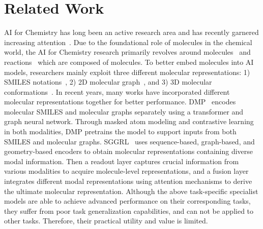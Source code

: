 \section{Related Work}

AI for Chemistry has long been an active research area and has recently garnered increasing attention~\cite{molformer, chemberta, honda2019smiles,graphcl, xia2023molebert, MGSSL, ying2021transformers,Denoising, 3dEMGP, zhou2023unimol, chen2023towards,shi2023relm,sagawa2023reactiont5, fang2023mol}. Due to the foundational role of molecules in the chemical world, the AI for Chemistry research primarily revolves around molecules~\cite{molformer, chemberta, honda2019smiles,graphcl, xia2023molebert, MGSSL, ying2021transformers,Denoising, 3dEMGP, zhou2023unimol} and reactions~\cite{chen2023towards,shi2023relm,sagawa2023reactiont5} which are composed of molecules. To better embed molecules into AI models, researchers mainly exploit three different molecular representations: 1) SMILES notations~\cite{molformer,chemberta,honda2019smiles}, 2) 2D molecular graph~\cite{graphcl,xia2023molebert,MGSSL,ying2021transformers}, and 3) 3D molecular conformations~\cite{Denoising, 3dEMGP, zhou2023unimol}. In recent years, many works have incorporated different molecular representations together for better performance. 
DMP~\cite{zhu2021dualview} encodes molecular SMILES and molecular graphs separately using a transformer and graph neural network. Through masked atom modeling and contrastive learning in both modalities, DMP pretrains the model to support inputs from both SMILES and molecular graphs. SGGRL~\cite{Wang2024MultiModalRL} uses sequence-based, graph-based, and geometry-based encoders to obtain molecular representations containing diverse modal information. Then a readout layer captures crucial information from various modalities to acquire molecule-level representations, and a fusion layer integrates different modal representations using attention mechanisms to derive the ultimate molecular representation.
Although the above task-specific specialist models are able to achieve advanced performance on their corresponding tasks, they suffer from poor task generalization capabilities, and can not be applied to other tasks. Therefore, their practical utility and value is limited.

